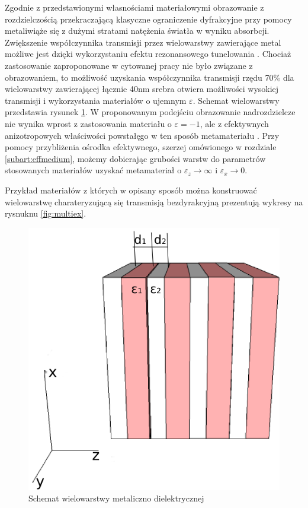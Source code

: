 Zgodnie z przedstawionymi własnościami materiałowymi obrazowanie z rozdzielczością przekraczającą klasyczne ograniczenie dyfrakcyjne przy pomocy metaliwiąże się z dużymi stratami natężenia światła w wyniku absorbcji. Zwiększenie współczynnika transmisji przez wielowarstwy zawierające metal możliwe jest dzięki wykorzystaniu efektu rezonansowego tunelowania \cite{scalora-transparentmetal}. Chociaż zastosowanie zaproponowane w cytowanej pracy nie było związane z obrazowaniem, to możliwość uzyskania współczynnika transmisji rzędu 70\% dla wielowarstwy zawierającej łącznie 40nm srebra otwiera możliwości wysokiej transmisji i wykorzystania materiałów o ujemnym $\varepsilon$. Schemat wielowarstwy przedstawia rysunek \ref{fig:mulschem}. W proponowanym podejściu obrazowanie nadrozdzielcze nie wynika wprost z zastosowania materiału o $\varepsilon = -1$, ale z efektywnych anizotropowych właściwości powstałęgo w ten sposób  metamateriału \cite{ramakrishna2003imaging}. Przy pomocy przybliżenia ośrodka efektywnego, szerzej omówionego w rozdziale \ref{subart:effmedium}, możemy dobierając grubości warstw do parametrów stosowanych materiałów uzyskać metamateriał o $\varepsilon_z \to \infty$ i $\varepsilon_x \to 0$.

Przykład materiałów z których w opisany sposób można konstruować wielowarstwę charateryzującą się transmisją bezdyrakcyjną prezentują wykresy na rysnuknu \ref{fig:multiex}. 




\begin{figure}[tb]
	\includegraphics[width=.5\textwidth]{images/multilayer/multilayer-3d.png}
	\caption{Schemat wielowarstwy metaliczno dielektrycznej}
	\label{fig:mulschem}
\end{figure}

